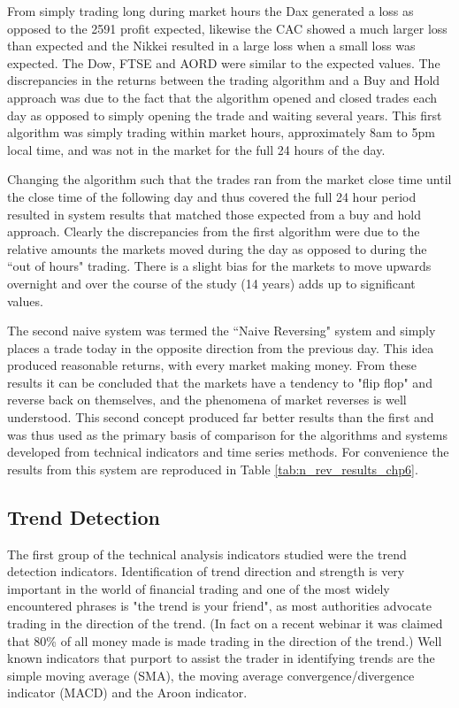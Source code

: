 From simply trading long during market hours the Dax generated a loss as opposed to the 2591 profit expected, likewise the CAC showed a much larger loss than expected and the Nikkei resulted in a large loss when a small loss was expected. The Dow, FTSE and AORD were similar to the expected values. The discrepancies in the returns between the trading algorithm and a Buy and Hold approach was due to
the fact that the algorithm opened and closed trades each day as opposed to simply opening the trade and waiting several years. This first algorithm was simply trading within market hours, approximately 8am to 5pm local time, and was not in the market for the full 24 hours of the day.

Changing the algorithm such that the trades ran from the market close time until the close time of the following day and thus covered the full 24 hour period resulted in system results that matched those expected from a buy and hold approach.  Clearly the discrepancies from the first algorithm were due to the relative amounts the markets moved during the day as opposed to during the \textquotedblleft out of hours" trading. There is a slight bias for the markets to move upwards overnight and over the course of the study (14 years) adds up to significant values.  

The second naive system was termed the \textquotedblleft Naive Reversing" system and simply places a trade today in the opposite direction from the previous day. This idea produced reasonable returns, with every market making money. From these results it can be concluded that the markets have a tendency to "flip flop" and reverse back on themselves, and the phenomena of market reverses is well understood. This second concept produced far better results than the first and was thus used as the primary basis of comparison for the algorithms and systems developed from technical indicators and time series methods. For convenience the results from this system are reproduced in Table \ref{tab:n_rev_results_chp6}.




\subsection{Trend Detection}
The first group of the technical analysis indicators studied were the trend detection indicators. Identification of trend direction and strength is very important in the world of financial trading and one of the most widely encountered phrases is "the trend is your friend", as most authorities advocate trading in the direction of the trend. (In fact on a recent webinar it was claimed that 80\% of all money made is made trading in the direction of the trend.)  Well known indicators that purport to assist the trader in identifying trends are the simple moving average (SMA), the moving average convergence/divergence indicator (MACD) and the Aroon indicator.

